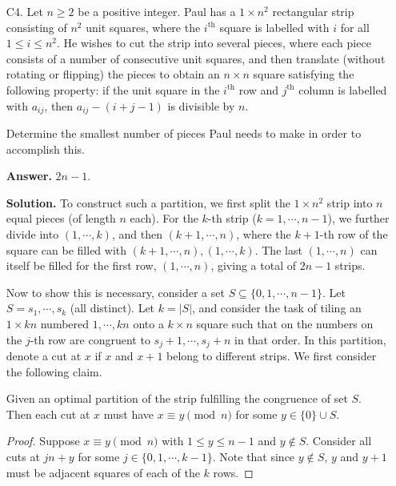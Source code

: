\documentclass[11pt,a4paper]{article}
\begin{document}
\begin{enumerate}
    	\item [C4.] 
    	Let $n\geqslant 2$ be a positive integer. Paul has a $1\times n^2$ rectangular strip consisting of $n^2$ unit squares, where the $i^{\text{th}}$ square is labelled with $i$ for all $1\leqslant i\leqslant n^2$. He wishes to cut the strip into several pieces, where each piece consists of a number of consecutive unit squares, and then translate (without rotating or flipping) the pieces to obtain an $n\times n$ square satisfying the following property: if the unit square in the $i^{\text{th}}$ row and $j^{\text{th}}$ column is labelled with $a_{ij}$, then $a_{ij}-(i+j-1)$ is divisible by $n$.
    	
    	Determine the smallest number of pieces Paul needs to make in order to accomplish this.
    	
    	\textbf{Answer.} $2n - 1$. 
    	
    	\textbf{Solution.} To construct such a partition, 
    	we first split the $1\times n^2$ strip into $n$ equal pieces (of length $n$ each). 
    	For the $k$-th strip 
    	($k=1, \cdots, n - 1$),
    	we further divide into $(1, \cdots, k)$, 
    	and then $(k+1, \cdots, n)$, 
    	where the $k+1$-th row of the square can be filled with 
    	$(k+1, \cdots, n), (1, \cdots, k)$. 
    	The last $(1, \cdots, n)$ can itself be filled for the first row, $(1, \cdots, n)$, 
    	giving a total of $2n-1$ strips. 
    	
    	Now to show this is necessary, 
    	consider a set $S \subseteq \{0, 1, \cdots, n - 1\}$. 
    	Let $S = s_1, \cdots, s_k$ (all distinct). 
    	Let $k = |S|$, 
    	and consider the task of tiling an $1\times kn$ numbered $1, \cdots, kn$ onto 
    	a $k\times n$ square such that on the numbers on the $j$-th row 
    	are congruent to $s_j + 1, \cdots, s_j + n$ in that order. 
    	In this partition, denote a cut at $x$ if $x$ and $x + 1$ belong to different strips. 
    	We first consider the following claim. 
    	\begin{lemma}
    		Given an optimal partition of the strip fulfilling the congruence of set $S$. 
    		Then each cut at $x$ must have $x\equiv y\pmod{n}$ for some $ y\in\{0\}\cup S$. 
    	\end{lemma}
    	
    	\begin{proof}
    		Suppose $x\equiv y\pmod{n}$ with $1\le y\le n - 1$ and $y\not\in S$. 
    		Consider all cuts at $jn + y$ for some $j\in \{0, 1, \cdots, k - 1\}$. 
    		Note that since $y\not\in S$, 
    		$y$ and $y + 1$ must be adjacent squares of each of the $k$ rows. 
    		

\end{proof}
\end{enumerate}
\end{document}
